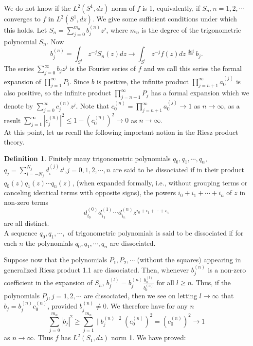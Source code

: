 \documentclass{amsart}
\theoremstyle{definition}
\newtheorem{Def}[Th]{Definition}
\theoremstyle{remark}
\numberwithin{equation}{section}
\newcommand{\1}{\mathbb{1}}
\begin{document}
We do not  know if the $L^2(S^1, dz)$ norm of $f$ is 1, equivalently, if $S_n, n=1,2,\cdots$  converges to $f$ in
$L^2(S^1,dz)$. We give some sufficient conditions under which this holds.  Let $S_n = \sum_{j=0}^{m_n}b_j^{(n)}z^j$,
where $m_n$ is the degree of the trigonometric polynomial $S_n$. Now
$$b_j^{(n)} = \int_{S^1}z^{-j}S_n(z)dz \rightarrow \int_{S^1}z^{-j}f(z)dz \stackrel{\textrm{def}}{=} b_j.$$
The series $\sum_{j=0}^\infty b_jz^j$ is the Fourier series of $f$ and we call this series the formal expansion of
$ \prod_{j=1}^\infty P_i$. Since $b$ is positive, the infinite product $ \prod_{j=n+1}^\infty a_0^{(j)}$ is also positive,
so the  infinite product $ \prod_{j=n+1}^\infty P_j$ has a formal expansion which we denote by
$\sum_{j=0}^\infty c_j^{(n)}z^j$. Note that $c_0^{(n)} =\prod_{j=n+1}^\infty a_{0}^{(j)} \longrightarrow 1$
as $n\longrightarrow \infty$, as a result $\sum_{j=1}^\infty|c_j^{(n)}|^2 \leq 1- (c_0^{(n)})^2 \longrightarrow 0$ as
$ n \rightarrow \infty$.\\

At this point, let us recall the following important notion in the Riesz product theory.

\begin{Def}\label{def2}  Finitely many trigonometric polynomials $q_0,q_1,\cdots,q_n$,\linebreak $q_j=\sum_{i=-N_j}^{N_j} d_i^{(j)}z^i$,$j=0,1,2,\cdots,n$ are said to be dissociated if in their product \linebreak $q_0(z)q_1(z)\cdots q_n(z)$, (when expanded formally, i.e., without grouping terms or canceling identical terms with opposite signs), the powers $i_0+i_1+\cdots+i_n$ of $z$ in non-zero terms
$$d_{i_0}^{(0)}d_{i_1}^{(1)}\cdots d_{i_n}^{(n)}z^{i_0+i_1+\cdots+i_n}$$ are all distinct.\\

A sequence $q_0,q_1,\cdots,$ of trigonometric polynomials is said to be dissociated if for each $n$ the polynomials
$q_0,q_1,\cdots,q_n$ are dissociated.
\end{Def}

Suppose now that the polynomials $P_1, P_2, \cdots$ (without the squares) appearing in generalized Riesz product 1.1 are dissociated. Then, whenever $b_j^{(n)}$ is a non-zero coefficient in the expansion of $S_n$, $ b_j^{(l)} = b_j^{(n)}\frac{b_0^{(l)}}{b_0^{(n)}}$ for all $l \geq n$. Thus, if the polynomials $P_j, j =1,2,\cdots$ are dissociated, then we see on letting $ l \rightarrow \infty$ that $b_j = b_{j}^{(n)}c_0^{(n)}$, provided $b_j^{(n)} \neq 0$. We therefore have for any $n$
 $$\sum_{j=0}^{m_n}| b_j|^2 \geq \sum_{j=1}^{m_n}\mid b_j^{(n)}\mid^2 (c_0^{(n)})^2 = (c_0^{(n)})^2 \longrightarrow 1$$ as $ n\rightarrow \infty$. Thus $ f$ has $L^2(S_1,dz)$ norm 1.
 We have proved:
\end{document}
